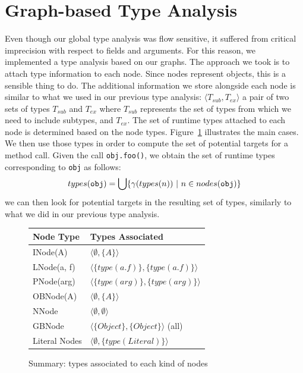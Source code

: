 \section{Graph-based Type Analysis}
Even though our global type analysis was flow sensitive, it suffered from
critical imprecision with respect to fields and arguments. For this reason, we
implemented a type analysis based on our graphs. The approach we took is to
attach type information to each node. Since nodes represent objects, this is a
sensible thing to do. The additional information we store alongside each node
is similar to what we used in our previous type analysis: $\langle T_{sub}, T_{ex} \rangle$
a pair of two sets of types $T_{sub}$ and $T_{ex}$ where $T_{sub}$ represents
the set of types from which we need to include subtypes, and $T_{ex}$.
The set of runtime types attached to each node is determined based on the node
types. Figure~\ref{fig:pt:types} illustrates the main cases. We then use those
types in order to compute the set of potential targets for a method call. Given
the call \verb/obj.foo()/, we obtain the set of runtime types corresponding to
\verb/obj/ as follows:
$$
    types(\verb/obj/) = \bigcup \{ \gamma(types(n)) ~|~ n \in nodes(\verb/obj/) \}
$$
we can then look for potential targets in the resulting set of types, similarly
to what we did in our previous type analysis.

\begin{figure}[h]
    \centering

    \begin{tabular}{ l | l }
        Node Type & Types Associated \\
        \hline
        INode(A)           & $\langle \emptyset, \{A\}\rangle$ \\
        LNode(a, f)        & $\langle\{type(a.f)\}, \{type(a.f)\}\rangle$ \\
        PNode(arg)         & $\langle\{type(arg)\}, \{type(arg)\}\rangle$ \\
        OBNode(A)          & $\langle \emptyset,   \{A\}\rangle$ \\
        NNode              & $\langle \emptyset,   \emptyset \rangle$ \\
        GBNode             & $\langle\{Object\},   \{Object\}\rangle$ (all)\\
        Literal Nodes      & $\langle \emptyset,   \{type(Literal)\}\rangle$\\
    \end{tabular}

    \caption{Summary: types associated to each kind of nodes}
    \label{fig:pt:types}
\end{figure}

